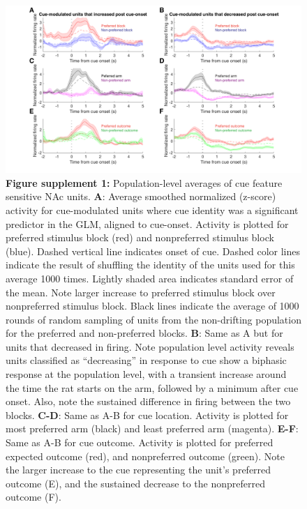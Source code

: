 \documentclass[11pt]{article}
\newcommand{\bsf}[1]{\textbf{#1}}
\begin{document}
 \begin{figure}[ht!]
\centering
\includegraphics[width=\textwidth]{Fig 6 - SUPP Population averages.pdf}
\caption*{\bsf{Figure supplement 1:} Population-level averages of cue feature sensitive NAc units. \bsf{A}:
  Average smoothed normalized (z-score) activity for cue-modulated units where
  cue identity was a significant predictor in the GLM, aligned to
  cue-onset. Activity is plotted for preferred stimulus block (red) and
  nonpreferred stimulus block (blue). Dashed vertical line indicates onset of
  cue. Dashed color lines indicate the result of shuffling the identity of the units used for this average 1000 times. Lightly shaded area indicates standard error of the mean. Note larger
  increase to preferred stimulus block over nonpreferred stimulus block. Black
  lines indicate the average of 1000 rounds of random sampling of units from the
  non-drifting population for the preferred and non-preferred blocks. \bsf{B}:
  Same as A but for units that decreased in firing. Note population level
  activity reveals units classified as “decreasing” in response to cue show a
  biphasic response at the population level, with a transient increase around
  the time the rat starts on the arm, followed by a minimum after cue
  onset. Also, note the sustained difference in firing between the two
  blocks. \bsf{C-D}: Same as A-B for cue location. Activity is plotted for
  most preferred arm (black) and least preferred arm (magenta). \bsf{E-F}: Same as A-B for cue outcome. Activity is
  plotted for preferred expected outcome (red), and nonpreferred outcome
  (green). Note the larger increase to the cue representing the unit’s preferred
  outcome (E), and the sustained decrease to the nonpreferred outcome (F).}
\label{fig:pop}
\end{figure} \clearpage
\end{document}
